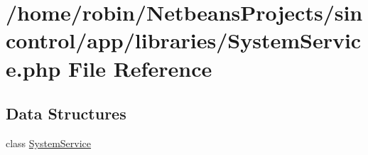 \hypertarget{_system_service_8php}{}\section{/home/robin/\+Netbeans\+Projects/sincontrol/app/libraries/\+System\+Service.php File Reference}
\label{_system_service_8php}
\subsection*{Data Structures}
\begin{DoxyCompactItemize}
\item 
class \hyperlink{class_system_service}{System\+Service}
\end{DoxyCompactItemize}
